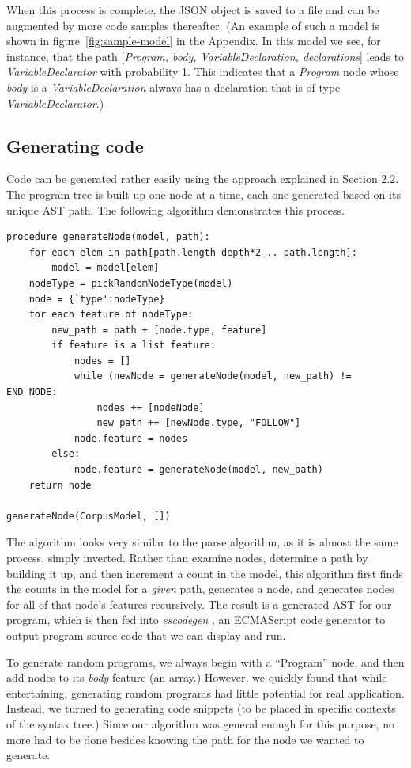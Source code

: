 \documentclass{article}
\begin{document}
When this process is complete, the JSON object is saved to a file and can be augmented by more code samples thereafter. (An example of such a model is shown in figure~\ref{fig:sample-model} in the Appendix. In this model we see, for instance, that the path
[\emph{Program, body, VariableDeclaration, declarations}] leads to
\emph{VariableDeclarator} with probability 1. This indicates that a \emph{Program}
node whose \emph{body} is a \emph{VariableDeclaration} always has a declaration that is of
type \emph{VariableDeclarator}.)

\subsection{Generating code}

Code can be generated rather easily using the approach explained in Section 2.2. The program tree is built up one node at a time, each one generated based on its unique AST path. The following algorithm demonstrates this process.

\clearpage

\begin{verbatim}
procedure generateNode(model, path):
    for each elem in path[path.length-depth*2 .. path.length]:
        model = model[elem]
    nodeType = pickRandomNodeType(model)
    node = {`type':nodeType}
    for each feature of nodeType:
        new_path = path + [node.type, feature]
        if feature is a list feature:
            nodes = []
            while (newNode = generateNode(model, new_path) != END_NODE:
                nodes += [nodeNode]
                new_path += [newNode.type, "FOLLOW"]
            node.feature = nodes
        else:
            node.feature = generateNode(model, new_path)
    return node

generateNode(CorpusModel, [])
\end{verbatim}

The algorithm looks very similar to the parse algorithm, as it is almost the same process, simply inverted. Rather than examine nodes, determine a path by building it up, and then increment a count in the model, this algorithm first finds the counts in the model for a \emph{given} path, generates a node, and generates nodes for all of that node's features recursively. The result is a generated AST for our program, which is then fed into \emph{escodegen} \cite{escodegen}, an ECMAScript code generator to output program source code that we can display and run.

To generate random programs, we always begin with a ``Program'' node, and then add nodes to its \emph{body} feature (an array.) However, we quickly found that while entertaining, generating random programs had little potential for real application. Instead, we turned to generating code snippets (to be placed in specific contexts of the syntax tree.) Since our algorithm was general enough for this purpose, no more had to be done besides knowing the path for the node we wanted to generate.
\end{document}
